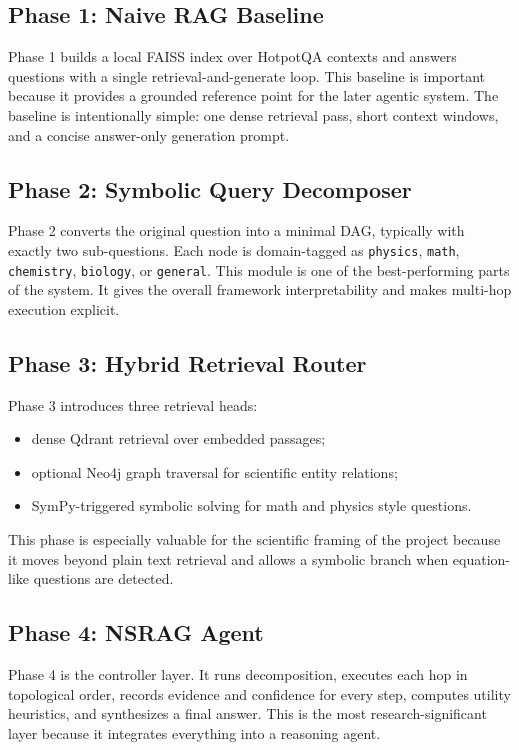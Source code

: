 \documentclass[11pt]{article}
\begin{document}
\subsection{Phase 1: Naive RAG Baseline}
Phase 1 builds a local FAISS index over HotpotQA contexts and answers questions with a single retrieval-and-generate loop. This baseline is important because it provides a grounded reference point for the later agentic system. The baseline is intentionally simple: one dense retrieval pass, short context windows, and a concise answer-only generation prompt.

\subsection{Phase 2: Symbolic Query Decomposer}
Phase 2 converts the original question into a minimal DAG, typically with exactly two sub-questions. Each node is domain-tagged as \texttt{physics}, \texttt{math}, \texttt{chemistry}, \texttt{biology}, or \texttt{general}. This module is one of the best-performing parts of the system. It gives the overall framework interpretability and makes multi-hop execution explicit.

\subsection{Phase 3: Hybrid Retrieval Router}
Phase 3 introduces three retrieval heads:

\begin{itemize}[leftmargin=1.2em]
\item dense Qdrant retrieval over embedded passages;
\item optional Neo4j graph traversal for scientific entity relations;
\item SymPy-triggered symbolic solving for math and physics style questions.
\end{itemize}

This phase is especially valuable for the scientific framing of the project because it moves beyond plain text retrieval and allows a symbolic branch when equation-like questions are detected.

\subsection{Phase 4: NSRAG Agent}
Phase 4 is the controller layer. It runs decomposition, executes each hop in topological order, records evidence and confidence for every step, computes utility heuristics, and synthesizes a final answer. This is the most research-significant layer because it integrates everything into a reasoning agent.
\end{document}
